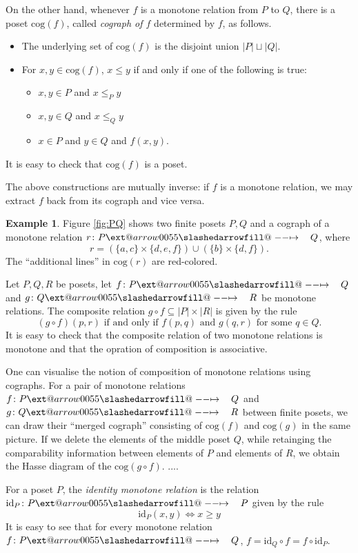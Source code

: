 \documentclass{article}
\makeatletter
\theoremstyle{definition}
\newtheorem{example}[theorem]{Example}
\newcommand{\cog}{\mathrm{cog}}
\newcommand{\id}{\mathrm{id}}
\newcommand{\sto}{\xslashedrightarrow{\hskip 1pc}}
\def\slashedarrowfill@#1#2#3#4#5{%
  $\m@th\thickmuskip0mu\medmuskip\thickmuskip\thinmuskip\thickmuskip
  \relax#5#1\mkern-7mu%
  \cleaders\hbox{$#5\mkern-2mu#2\mkern-2mu$}\hfill
  \mathclap{#3}\mathclap{#2}%
  \cleaders\hbox{$#5\mkern-2mu#2\mkern-2mu$}\hfill
  \mkern-7mu#4$%
}
\def\rightslashedarrowfill@{%
  \slashedarrowfill@\relbar\relbar\mapstochar\rightarrow}
\newcommand\xslashedrightarrow[2][]{%
  \ext@arrow 0055{\rightslashedarrowfill@}{#1}{#2}}
\makeatother
\begin{document}
On the other hand, whenever $f$ is a monotone relation from $P$ to $Q$,
there is a poset $\cog(f)$, called {\em cograph of $f$} determined by $f$, as follows.
\begin{itemize}
\item The underlying set of $\cog(f)$ is the disjoint union $|P|\sqcup|Q|$.
\item For $x,y\in\cog(f)$, $x\leq y$ if and only if one of the following is true:
\begin{itemize}
\item $x,y\in P$ and $x\leq_P y$
\item $x,y\in Q$ and $x\leq_Q y$
\item $x\in P$ and $y\in Q$ and $f(x,y)$.
\end{itemize}
\end{itemize}
It is easy to check that $\cog(f)$ is a poset.

The above constructions are mutually inverse: if $f$ is a monotone relation, we may
extract $f$ back from its cograph and vice versa.

\begin{example}
Figure \ref{fig:PQ} shows two finite posets $P,Q$ and a cograph of a monotone
relation $r\colon P\sto Q$, where
$$
r=(\{a,c\}\times\{d,e,f\})\cup(\{b\}\times\{d,f\}).
$$
The ``additional lines'' in $\cog(r)$ are red-colored.
\end{example}

Let $P,Q,R$ be posets, let $f\colon P\sto Q$ and $g\colon Q\sto R$ be
monotone relations. The composite relation $g\circ f\subseteq|P|\times|R|$ is given
by the rule
$$
(g\circ f)(p,r)\text{ if and only if }
	f(p,q)\text{ and }g(q,r)\text{ for some }q\in Q.
$$
It is easy to check that the composite relation of two monotone relations is
monotone and that the opration of composition is associative.

One can visualise the notion of composition of monotone relations using cographs.
For a pair of monotone relations $f\colon P\sto Q$ and $g\colon Q\sto R$ between
finite posets, we can draw their ``merged cograph'' consisting of 
$\cog(f)$ and $\cog(g)$ in the same picture. If we delete the elements of the
middle poset $Q$, while retainging the comparability information between elements
of $P$ and elements of $R$, we obtain the Hasse diagram of the $\cog(g\circ f)$.
....

For a poset $P$, the {\em identity monotone relation} is the relation
$\id_P\colon P\sto P$ given by the rule
$$
\id_P(x,y)\Leftrightarrow x\geq y
$$
It is easy to see that for every monotone relation $f\colon P\sto Q$,
$f=\id_Q\circ f=f\circ\id_P$.
\end{document}
